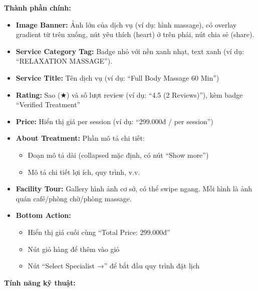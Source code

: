 \textbf{Thành phần chính:}

\begin{itemize}
    \item \textbf{Image Banner:} Ảnh lớn của dịch vụ (ví dụ: hình massage), có overlay gradient từ trên xuống, nút yêu thích (heart) ở trên phải, nút chia sẻ (share).
    
    \item \textbf{Service Category Tag:} Badge nhỏ với nền xanh nhạt, text xanh (ví dụ: ``RELAXATION MASSAGE'').
    
    \item \textbf{Service Title:} Tên dịch vụ (ví dụ: ``Full Body Massage 60 Min'')
    
    \item \textbf{Rating:} Sao (★) và số lượt review (ví dụ: ``4.5 (2 Reviews)''), kèm badge ``Verified Treatment''
    
    \item \textbf{Price:} Hiển thị giá per session (ví dụ: ``299.000đ / per session'')
    
    \item \textbf{About Treatment:} Phần mô tả chi tiết:
    \begin{itemize}
        \item Đoạn mô tả dài (collapsed mặc định, có nút ``Show more'')
        \item Mô tả chi tiết lợi ích, quy trình, v.v.
    \end{itemize}
    
    \item \textbf{Facility Tour:} Gallery hình ảnh cơ sở, có thể swipe ngang. Mỗi hình là ảnh quán café/phòng chờ/phòng massage.
    
    \item \textbf{Bottom Action:}
    \begin{itemize}
        \item Hiển thị giá cuối cùng ``Total Price: 299.000đ''
        \item Nút giỏ hàng để thêm vào giỏ
        \item Nút ``Select Specialist →'' để bắt đầu quy trình đặt lịch
    \end{itemize}
\end{itemize}

\textbf{Tính năng kỹ thuật:}

